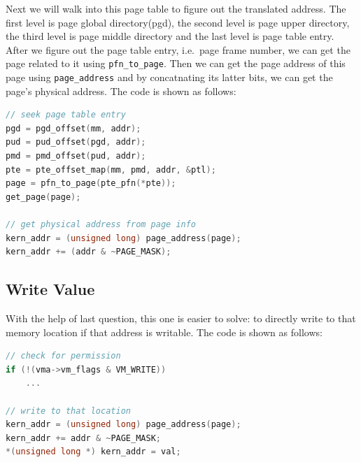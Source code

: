 \documentclass{article}
\begin{document}
Next we will walk into this page table to figure out the translated address. The first level is page global directory(pgd), the second level is page upper directory, the third level is page middle directory and the last level is page table entry. After we figure out the page table entry, i.e.\ page frame number, we can get the page related to it using \verb|pfn_to_page|. Then we can get the page address of this page using \verb|page_address| and by concatnating its latter bits, we can get the page's physical address. The code is shown as follows:
\begin{lstlisting}[language=c]
// seek page table entry
pgd = pgd_offset(mm, addr);
pud = pud_offset(pgd, addr);
pmd = pmd_offset(pud, addr);
pte = pte_offset_map(mm, pmd, addr, &ptl);
page = pfn_to_page(pte_pfn(*pte));
get_page(page);

// get physical address from page info
kern_addr = (unsigned long) page_address(page);
kern_addr += (addr & ~PAGE_MASK);
\end{lstlisting}

\subsection{Write Value}
With the help of last question, this one is easier to solve: to directly write to that memory location if that address is writable. The code is shown as follows:
\begin{lstlisting}[language=C]
// check for permission
if (!(vma->vm_flags & VM_WRITE))
	...

// write to that location
kern_addr = (unsigned long) page_address(page);
kern_addr += addr & ~PAGE_MASK;
*(unsigned long *) kern_addr = val;
\end{lstlisting}
\end{document}
